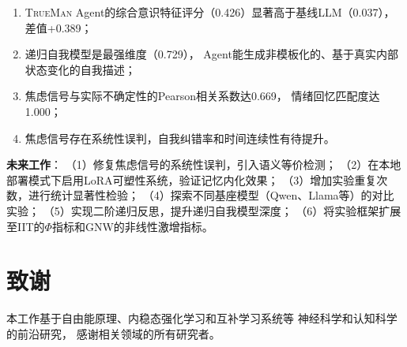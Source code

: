 \documentclass[11pt,a4paper]{article}
\newcommand{\TrueMan}{\textsc{TrueMan}}
\begin{document}
\begin{enumerate}[leftmargin=2em]
    \item \TrueMan{} Agent的综合意识特征评分（0.426）显著高于基线LLM（0.037），
    差值+0.389；
    \item 递归自我模型是最强维度（0.729），
    Agent能生成非模板化的、基于真实内部状态变化的自我描述；
    \item 焦虑信号与实际不确定性的Pearson相关系数达0.669，
    情绪回忆匹配度达1.000；
    \item 焦虑信号存在系统性误判，自我纠错率和时间连续性有待提升。
\end{enumerate}

\textbf{未来工作}：
（1）修复焦虑信号的系统性误判，引入语义等价检测；
（2）在本地部署模式下启用LoRA可塑性系统，验证记忆内化效果；
（3）增加实验重复次数，进行统计显著性检验；
（4）探索不同基座模型（Qwen、Llama等）的对比实验；
（5）实现二阶递归反思，提升递归自我模型深度；
（6）将实验框架扩展至IIT的$\Phi$指标和GNW的非线性激增指标。

\section*{致谢}

本工作基于自由能原理、内稳态强化学习和互补学习系统等
神经科学和认知科学的前沿研究，
感谢相关领域的所有研究者。

\end{document}
